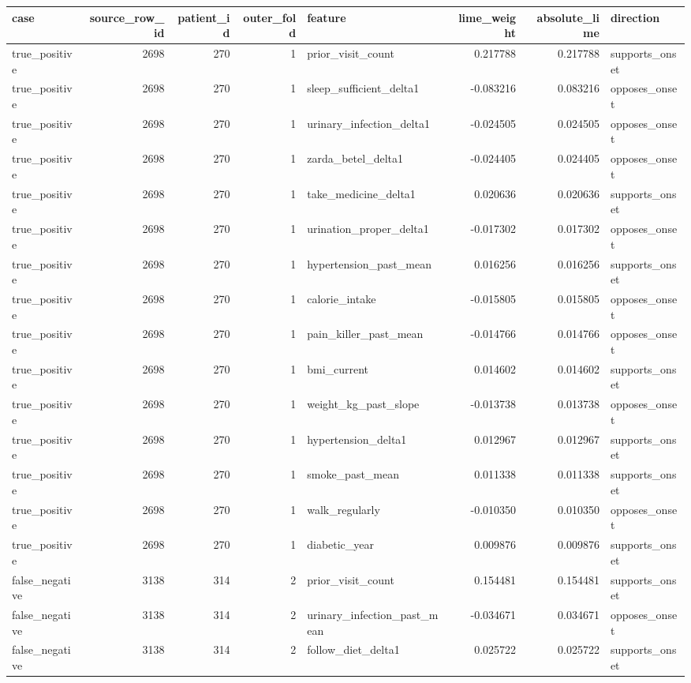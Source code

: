 \begin{tabular}{lrrrlrrl}
\toprule
case & source\_row\_id & patient\_id & outer\_fold & feature & lime\_weight & absolute\_lime & direction \\
\midrule
true\_positive & 2698 & 270 & 1 & prior\_visit\_count & 0.217788 & 0.217788 & supports\_onset \\
true\_positive & 2698 & 270 & 1 & sleep\_sufficient\_delta1 & -0.083216 & 0.083216 & opposes\_onset \\
true\_positive & 2698 & 270 & 1 & urinary\_infection\_delta1 & -0.024505 & 0.024505 & opposes\_onset \\
true\_positive & 2698 & 270 & 1 & zarda\_betel\_delta1 & -0.024405 & 0.024405 & opposes\_onset \\
true\_positive & 2698 & 270 & 1 & take\_medicine\_delta1 & 0.020636 & 0.020636 & supports\_onset \\
true\_positive & 2698 & 270 & 1 & urination\_proper\_delta1 & -0.017302 & 0.017302 & opposes\_onset \\
true\_positive & 2698 & 270 & 1 & hypertension\_past\_mean & 0.016256 & 0.016256 & supports\_onset \\
true\_positive & 2698 & 270 & 1 & calorie\_intake & -0.015805 & 0.015805 & opposes\_onset \\
true\_positive & 2698 & 270 & 1 & pain\_killer\_past\_mean & -0.014766 & 0.014766 & opposes\_onset \\
true\_positive & 2698 & 270 & 1 & bmi\_current & 0.014602 & 0.014602 & supports\_onset \\
true\_positive & 2698 & 270 & 1 & weight\_kg\_past\_slope & -0.013738 & 0.013738 & opposes\_onset \\
true\_positive & 2698 & 270 & 1 & hypertension\_delta1 & 0.012967 & 0.012967 & supports\_onset \\
true\_positive & 2698 & 270 & 1 & smoke\_past\_mean & 0.011338 & 0.011338 & supports\_onset \\
true\_positive & 2698 & 270 & 1 & walk\_regularly & -0.010350 & 0.010350 & opposes\_onset \\
true\_positive & 2698 & 270 & 1 & diabetic\_year & 0.009876 & 0.009876 & supports\_onset \\
false\_negative & 3138 & 314 & 2 & prior\_visit\_count & 0.154481 & 0.154481 & supports\_onset \\
false\_negative & 3138 & 314 & 2 & urinary\_infection\_past\_mean & -0.034671 & 0.034671 & opposes\_onset \\
false\_negative & 3138 & 314 & 2 & follow\_diet\_delta1 & 0.025722 & 0.025722 & supports\_onset \\

\end{tabular}
